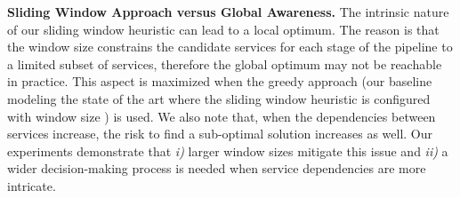 {    \vspace{0.5em}
    
    \noindent\textbf{Sliding Window Approach versus Global Awareness.} The intrinsic nature of our sliding window heuristic can lead to a local optimum. The reason is that the window size constrains the candidate services for each stage of the pipeline to a limited subset of services, therefore the global optimum may not be reachable in practice. This aspect is maximized when the greedy approach (our baseline modeling the state of the art where the sliding window heuristic is configured with window size ) is used. We also note that, when the dependencies between services increase, the risk to find a sub-optimal solution increases as well. Our experiments demonstrate that \emph{i)} larger window sizes mitigate this issue and \emph{ii)} a wider decision-making process is needed when service dependencies are more intricate.
}


